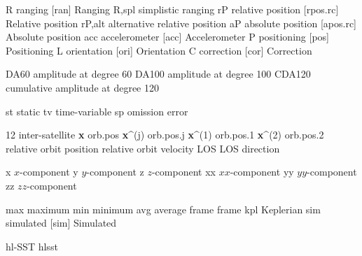 \begin{acronym}[---------------]
					{R}							{ranging}
					[\acs{ran}]			{Ranging}
			{R,spl}					{simplistic ranging}
			{rP}						{relative position}
			[\acs{rpos.rc}]	{Relative position}
		{rP,alt}				{alternative relative position}
			{aP}						{absolute position}
			[\acs{apos.rc}]	{Absolute position}
					{acc}						{accelerometer}
					[\acs{acc}]			{Accelerometer}
					{P}							{positioning}
					[\acs{pos}]			{Positioning}
					{L}							{orientation}
					[\acs{ori}]			{Orientation}
					{C}							{correction}
					[\acs{cor}]			{Correction}

					{DA60}					{amplitude at degree 60}
					{DA100}					{amplitude at degree 100}
					{CDA120}				{cumulative amplitude at degree 120}


					{st}						{static}
					{tv}						{time-variable}
					{sp}						{omission error}

					{12}				    {inter-satellite}
		{{\bf x}}				{\acl{orb.pos}}
	{{\bf x}^{(j)}}	{\acl{orb.pos.j}}
	{{\bf x}^{(1)}} {\acl{orb.pos.1}}
	{{\bf x}^{(2)}} {\acl{orb.pos.2}}
				{}
                                          {relative orbit position}
				{}
																					{relative orbit velocity}
				{LOS}						{\ac{LOS} direction}

					{x}							{$x$-component}
					{y}							{$y$-component}
					{z}							{$z$-component}
					{xx}						{$xx$-component}
					{yy}						{$yy$-component}
					{zz}						{$zz$-component}

					{max}						{maximum}
					{min}						{minimum}
					{avg}						{average}
				{frame}					{frame}
					{kpl}						{Keplerian}
					{sim}						{simulated}
					[\acs{sim}]			{Simulated}

			{hl-SST} 				{\acl{hlsst}}


\end{acronym}
